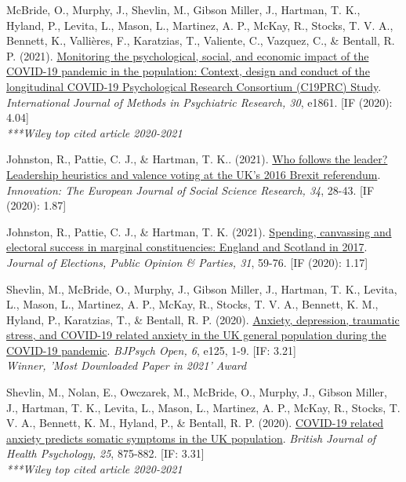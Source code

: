 \documentclass[12pt]{article}
\begin{document}
\begin{bibenum}
\item McBride, O., Murphy, J., Shevlin, M., 
	Gibson Miller, J., Hartman, T. K., Hyland, P., 
	Levita, L., Mason, L., Martinez, A. P., 
	McKay, R., Stocks, T. V. A., Bennett, K., 
	Vallières, F., Karatzias, T., Valiente, C., 
	Vazquez, C., \& Bentall, R. P. (2021). 
	\href{https://doi.org/10.1002/mpr.1861}
	{Monitoring the psychological, social, and 
	economic impact of the COVID-19 pandemic in 
	the population: Context, design and conduct 
	of the longitudinal COVID-19 Psychological 
	Research Consortium (C19PRC) Study}.
	\emph{International Journal of Methods in 
	Psychiatric Research, 30}, e1861. [IF (2020): 4.04]\\
	\textit{***Wiley top cited article 2020-2021}
	
\item Johnston, R., Pattie, C. J., \& {Hartman, T. K.}. 
	(2021). 
	\href{https://doi.org/10.1080/13511610.2020.1746905}
	{Who follows the leader? Leadership heuristics 
	and valence voting at the UK’s 2016 Brexit referendum}. 
	\emph{Innovation: The European Journal of Social 
	Science Research, 34}, 28-43. [IF (2020): 1.87]

\item Johnston, R., Pattie, C. J., \& Hartman, T. K. 
	(2021). 
	\href{https://doi.org/10.1080/17457289.2019.1582534}
	{Spending, canvassing and electoral success in 
	marginal constituencies: England and Scotland 
	in 2017}. \emph{Journal of Elections, Public 
	Opinion \& Parties, 31}, 59-76. [IF (2020): 1.17]
		
\item Shevlin, M.,  McBride, O., Murphy, J., 
	Gibson Miller, J., Hartman, T. K., Levita, L., 
	Mason, L., Martinez, A. P., McKay, R., 
	Stocks, T. V. A., Bennett, K. M., Hyland, P., 
	Karatzias, T., \& Bentall, R. P. (2020). 
	\href{https://doi.org/10.1192/bjo.2020.109}
	{Anxiety, depression, traumatic stress, and COVID-19 
	related anxiety in the UK general population 
	during the COVID-19 pandemic}.
	\emph{BJPsych Open, 6}, e125, 1-9. [IF: 3.21]\\
	\textit{Winner, 'Most Downloaded Paper in 2021' Award}

\item Shevlin, M., Nolan, E., Owczarek, M., 
	McBride, O., Murphy, J., Gibson Miller, J., 
	Hartman, T. K., Levita, L., Mason, L., 
	Martinez, A. P., McKay, R., Stocks, T. V. A., 
	Bennett, K. M., Hyland, P., \& Bentall, R. P. (2020).
	\href{https://doi.org/10.1111/bjhp.12430}
	{COVID-19 related anxiety predicts somatic 
	symptoms in the UK population}.
	\emph{British Journal of Health Psychology, 25}, 
	875-882. [IF: 3.31]\\
	\textit{***Wiley top cited article 2020-2021}


\end{bibenum}
\end{document}
